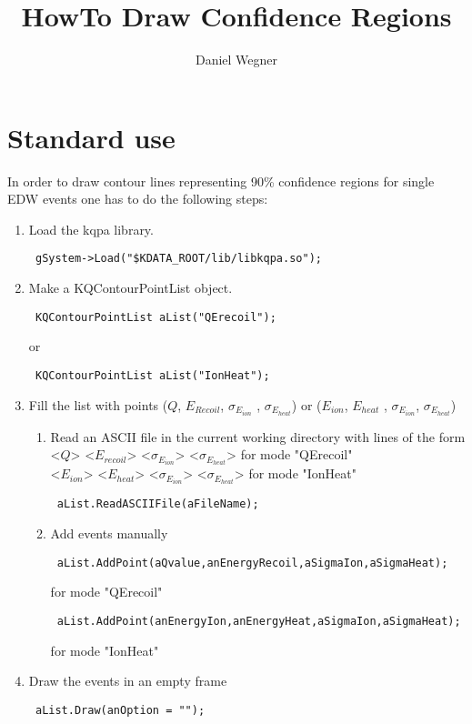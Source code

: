 \documentclass[10pt, a4paper]{article}
\title{HowTo Draw Confidence Regions}
\author{Daniel Wegner}
\begin{document}
\maketitle

\section{Standard use}

In order to draw contour lines representing 90\% confidence regions for single EDW events one has to do the following steps:

\begin{enumerate}
\item Load the kqpa library.
\begin{verbatim} gSystem->Load("$KDATA_ROOT/lib/libkqpa.so"); \end{verbatim}
\item Make a KQContourPointList object.
\begin{verbatim} KQContourPointList aList("QErecoil"); \end{verbatim}
or 
\begin{verbatim} KQContourPointList aList("IonHeat"); \end{verbatim}
\item Fill the list with points ($Q$, $E_{Recoil}$, $\sigma_{E_{ion}}$ , $\sigma_{E_{heat}}$) or ($E_{ion}$, $E_{heat}$ , $\sigma_{E_{ion}}$, $\sigma_{E_{heat}}$)

\begin{enumerate}
\item Read an ASCII file in the current working directory with lines of the form \\ <$Q$> <$E_{recoil}$> <$\sigma_{E_{ion}}$> <$\sigma_{E_{heat}}$> for mode "QErecoil" \\
 <$E_{ion}$> <$E_{heat}$> <$\sigma_{E_{ion}}$> <$\sigma_{E_{heat}}$> for mode "IonHeat"
\begin{verbatim} aList.ReadASCIIFile(aFileName); \end{verbatim}
\item Add events manually
\begin{verbatim} aList.AddPoint(aQvalue,anEnergyRecoil,aSigmaIon,aSigmaHeat); \end{verbatim} for mode "QErecoil"
\begin{verbatim} aList.AddPoint(anEnergyIon,anEnergyHeat,aSigmaIon,aSigmaHeat); \end{verbatim} for mode "IonHeat"
\end{enumerate}
\item Draw the events in an empty frame
\begin{verbatim} aList.Draw(anOption = ""); \end{verbatim}
\end{enumerate}
\end{document}
